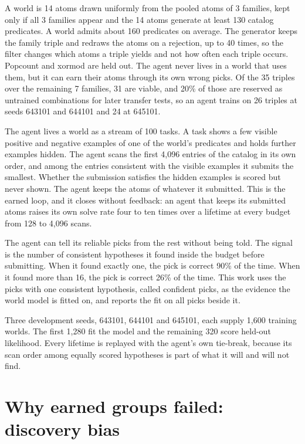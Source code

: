 \documentclass[11pt]{article}
\begin{document}
A world is 14 atoms drawn uniformly from the pooled atoms of 3 families, kept only if all 3 families appear and the 14 atoms generate at least 130 catalog predicates. A world admits about 160 predicates on average. The generator keeps the family triple and redraws the atoms on a rejection, up to 40 times, so the filter changes which atoms a triple yields and not how often each triple occurs. Popcount and xormod are held out. The agent never lives in a world that uses them, but it can earn their atoms through its own wrong picks. Of the 35 triples over the remaining 7 families, 31 are viable, and 20\% of those are reserved as untrained combinations for later transfer tests, so an agent trains on 26 triples at seeds 643101 and 644101 and 24 at 645101.

The agent lives a world as a stream of 100 tasks. A task shows a few visible positive and negative examples of one of the world's predicates and holds further examples hidden. The agent scans the first 4,096 entries of the catalog in its own order, and among the entries consistent with the visible examples it submits the smallest. Whether the submission satisfies the hidden examples is scored but never shown. The agent keeps the atoms of whatever it submitted. This is the earned loop, and it closes without feedback: an agent that keeps its submitted atoms raises its own solve rate four to ten times over a lifetime at every budget from 128 to 4,096 scans.

The agent can tell its reliable picks from the rest without being told. The signal is the number of consistent hypotheses it found inside the budget before submitting. When it found exactly one, the pick is correct 90\% of the time. When it found more than 16, the pick is correct 26\% of the time. This work uses the picks with one consistent hypothesis, called confident picks, as the evidence the world model is fitted on, and reports the fit on all picks beside it.

Three development seeds, 643101, 644101 and 645101, each supply 1,600 training worlds. The first 1,280 fit the model and the remaining 320 score held-out likelihood. Every lifetime is replayed with the agent's own tie-break, because its scan order among equally scored hypotheses is part of what it will and will not find.

\section{Why earned groups failed: discovery bias}
\end{document}
